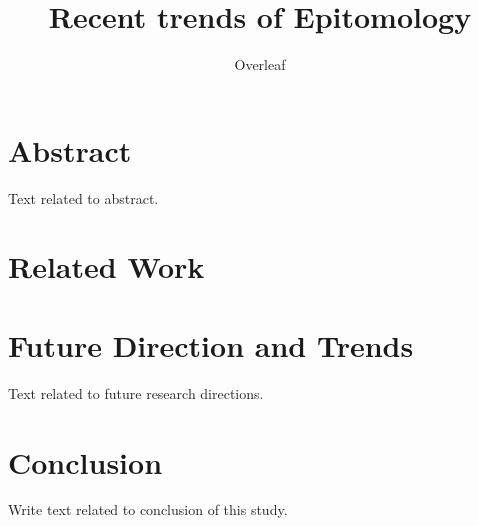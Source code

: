 \documentclass[a4paper,10pt]{article}
\title{Recent trends of Epitomology}
\author{Overleaf}
\begin{document}
\maketitle

\section{Abstract}
Text related to abstract.



\section{Related Work}





\cite{fourrier_methodological_20}

\section{Future Direction and Trends}
Text related to future research directions.

\section{Conclusion}
Write text related to conclusion of this study.



\end{document}
